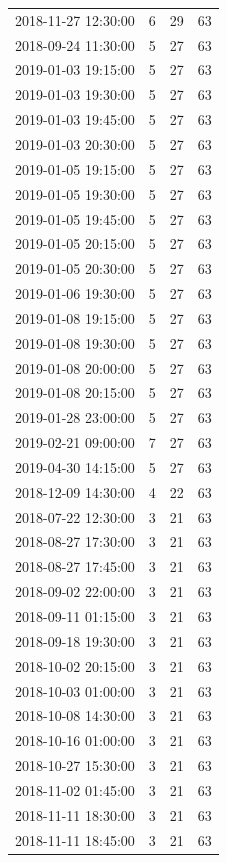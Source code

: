 \begin{tabular}{lrrr}
2018-11-27 12:30:00 & 6 & 29 & 63 \\
2018-09-24 11:30:00 & 5 & 27 & 63 \\
2019-01-03 19:15:00 & 5 & 27 & 63 \\
2019-01-03 19:30:00 & 5 & 27 & 63 \\
2019-01-03 19:45:00 & 5 & 27 & 63 \\
2019-01-03 20:30:00 & 5 & 27 & 63 \\
2019-01-05 19:15:00 & 5 & 27 & 63 \\
2019-01-05 19:30:00 & 5 & 27 & 63 \\
2019-01-05 19:45:00 & 5 & 27 & 63 \\
2019-01-05 20:15:00 & 5 & 27 & 63 \\
2019-01-05 20:30:00 & 5 & 27 & 63 \\
2019-01-06 19:30:00 & 5 & 27 & 63 \\
2019-01-08 19:15:00 & 5 & 27 & 63 \\
2019-01-08 19:30:00 & 5 & 27 & 63 \\
2019-01-08 20:00:00 & 5 & 27 & 63 \\
2019-01-08 20:15:00 & 5 & 27 & 63 \\
2019-01-28 23:00:00 & 5 & 27 & 63 \\
2019-02-21 09:00:00 & 7 & 27 & 63 \\
2019-04-30 14:15:00 & 5 & 27 & 63 \\
2018-12-09 14:30:00 & 4 & 22 & 63 \\
2018-07-22 12:30:00 & 3 & 21 & 63 \\
2018-08-27 17:30:00 & 3 & 21 & 63 \\
2018-08-27 17:45:00 & 3 & 21 & 63 \\
2018-09-02 22:00:00 & 3 & 21 & 63 \\
2018-09-11 01:15:00 & 3 & 21 & 63 \\
2018-09-18 19:30:00 & 3 & 21 & 63 \\
2018-10-02 20:15:00 & 3 & 21 & 63 \\
2018-10-03 01:00:00 & 3 & 21 & 63 \\
2018-10-08 14:30:00 & 3 & 21 & 63 \\
2018-10-16 01:00:00 & 3 & 21 & 63 \\
2018-10-27 15:30:00 & 3 & 21 & 63 \\
2018-11-02 01:45:00 & 3 & 21 & 63 \\
2018-11-11 18:30:00 & 3 & 21 & 63 \\
2018-11-11 18:45:00 & 3 & 21 & 63 \\

\end{tabular}
